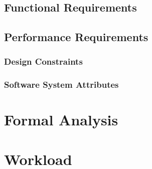 \documentclass[a4paper, oneside]{book}
\begin{document}
\section{Functional Requirements}
\section{Performance Requirements}
\subsection{Design Constraints}
\subsection{Software System Attributes}

\chapter{Formal Analysis}

\chapter{Workload}

\printbibliography
\end{document}
